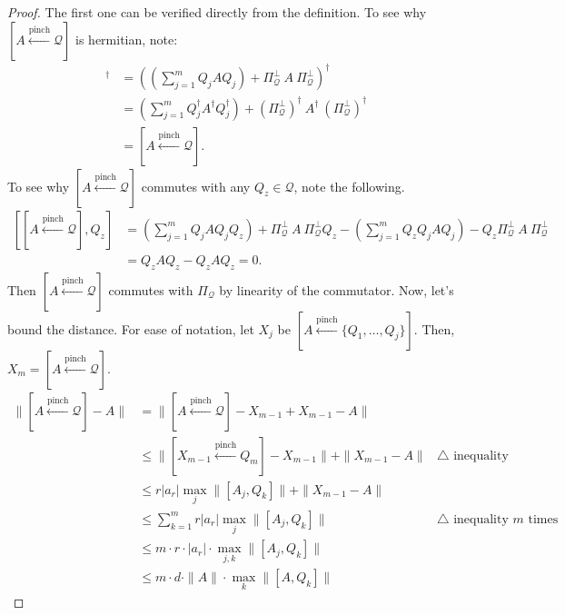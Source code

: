 \begin{proof}
    The first one can be verified directly from the definition. To see why $[A \overset{\text{pinch}}{\gets} \mathcal{Q}]$ is hermitian, note:
    \begin{align*}
        [A \overset{\text{pinch}}{\gets} \mathcal{Q}]^\dagger &= \left(\left(\sum\limits_{j = 1}^m Q_j AQ_j\right) + \Pi_{\mathcal{Q}}^\bot \ A\ \Pi_{\mathcal{Q}}^\bot\right)^\dagger\\
        &= \left(\sum\limits_{j = 1}^m Q_j^\dagger A^\dagger Q_j^\dagger \right) + (\Pi_{\mathcal{Q}}^\bot)^\dagger \ A^\dagger\ (\Pi_{\mathcal{Q}}^\bot)^\dagger\\
        &= [A \overset{\text{pinch}}{\gets} \mathcal{Q}].
    \end{align*}
To see why $[A \overset{\text{pinch}}{\gets} \mathcal{Q}]$ commutes with any $Q_z \in \mathcal{Q}$, note the following.
\begin{align*}
    \left[[A \overset{\text{pinch}}{\gets} \mathcal{Q}], Q_z\right] &= \left(\sum\limits_{j = 1}^m Q_j AQ_j Q_z\right) + \Pi_{\mathcal{Q}}^\bot \ A\ \Pi_{\mathcal{Q}}^\bot Q_z - \left(\sum\limits_{j = 1}^m Q_z Q_j AQ_j\right) - Q_z\Pi_{\mathcal{Q}}^\bot \ A\ \Pi_{\mathcal{Q}}^\bot\\
    &= Q_z A Q_z - Q_z A Q_z = 0.
\end{align*}
Then $[A \overset{\text{pinch}}{\gets} \mathcal{Q}]$ commutes with $\Pi_{\mathcal{Q}}$ by linearity of the commutator.
Now, let's bound the distance. For ease of notation, let $X_{j}$ be $[A \overset{\text{pinch}}{\gets} \{Q_1, \dots, Q_j\}]$. Then, $X_m = [A \overset{\text{pinch}}{\gets} \mathcal{Q}]$.
\begin{align*}
    \|[A \overset{\text{pinch}}{\gets} \mathcal{Q}] - A\| &= \|[A \overset{\text{pinch}}{\gets} \mathcal{Q}] - X_{m-1} + X_{m-1} - A\|\\
    &\leq \|[X_{m-1} \overset{\text{pinch}}{\gets} Q_m] -X_{m-1}\| + \|X_{m-1} - A\| & \triangle  \text{ inequality}\\
    &\leq r |a_r| \max_{j}\| [A_j, Q_k]\| + \|X_{m-1} - A\|\\
    &\leq \sum\limits_{k = 1}^m r |a_r| \max_{j}\| [A_j, Q_k]\| & \triangle  \text{ inequality $m$ times}\\
    &\leq m \cdot r \cdot |a_r|\cdot \max_{j, k}\| [A_j, Q_k]\|\\
    &\leq m \cdot d \cdot \|A\|\cdot \max_{k}\| [A, Q_k]\|
\end{align*}
\end{proof}


